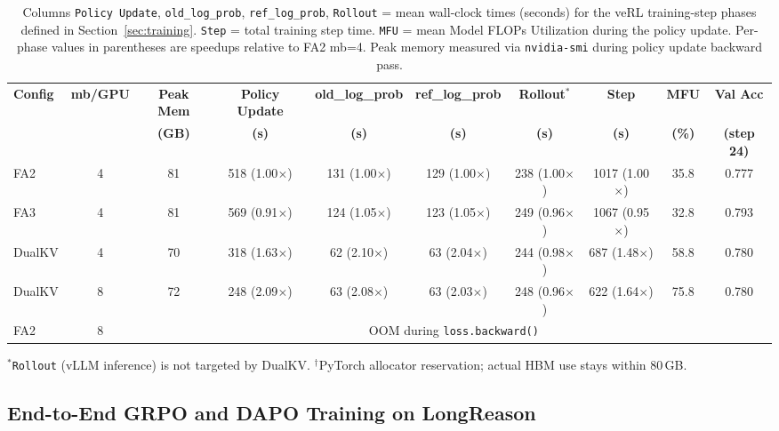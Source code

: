 \documentclass{article}
\begin{document}
\begin{table}
\tiny
\centering
\centering
\scriptsize
\setlength{\tabcolsep}{3pt}
\caption{Columns \texttt{Policy Update}, \texttt{old\_log\_prob}, \texttt{ref\_log\_prob}, \texttt{Rollout} = mean wall-clock times (seconds) for the veRL training-step phases defined in Section~\ref{sec:training}. \texttt{Step} = total training step time. \texttt{MFU} = mean Model FLOPs Utilization during the policy update. Per-phase values in parentheses are speedups relative to FA2 mb=4. Peak memory measured via \texttt{nvidia-smi} during policy update backward pass.}
\label{tab:e2e-longreason}
\begin{tabular}{@{}lc c c c c c c c c@{}}
\toprule
\textbf{Config} & \textbf{mb/GPU} & \textbf{Peak Mem} & \textbf{Policy Update} & \textbf{old\_log\_prob} & \textbf{ref\_log\_prob} & \textbf{Rollout$^{*}$} & \textbf{Step} & \textbf{MFU} & \textbf{Val Acc} \\
 & & \textbf{(GB)} & \textbf{(s)} & \textbf{(s)} & \textbf{(s)} & \textbf{(s)} & \textbf{(s)} & \textbf{(\%)} & \textbf{(step 24)} \\
\midrule
FA2      & 4 & 81\rlap{$^\dagger$} & 518 (1.00$\times$) & 131 (1.00$\times$) & 129 (1.00$\times$) & 238 (1.00$\times$) & 1017 (1.00$\times$) & 35.8 & 0.777 \\
FA3      & 4 & 81\rlap{$^\dagger$} & 569 (0.91$\times$) & 124 (1.05$\times$) & 123 (1.05$\times$) & 249 (0.96$\times$) & 1067 (0.95$\times$) & 32.8 & 0.793 \\
DualKV   & 4 & 70                 & 318 (1.63$\times$) &  62 (2.10$\times$) &  63 (2.04$\times$) & 244 (0.98$\times$) &  687 (1.48$\times$) & 58.8 & 0.780 \\
DualKV   & 8 & 72                 & 248 (2.09$\times$) &  63 (2.08$\times$) &  63 (2.03$\times$) & 248 (0.96$\times$) &  622 (1.64$\times$) & 75.8 & 0.780 \\
FA2      & 8 & \multicolumn{8}{c}{OOM during \texttt{loss.backward()}} \\
\bottomrule
\end{tabular}
\vspace{2pt}

{\scriptsize $^{*}$\texttt{Rollout} (vLLM inference) is not targeted by DualKV. \quad $^\dagger$PyTorch allocator reservation; actual HBM use stays within 80\,GB.}
\end{table}
\fi

\subsection{End-to-End GRPO and DAPO Training on LongReason}
\label{sec:e2e-longreason}
\end{document}
